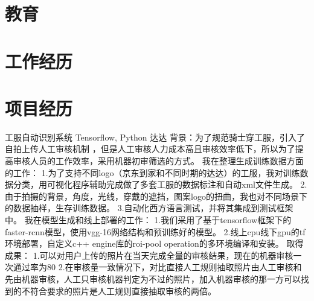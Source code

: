 \documentclass[11pt,a4paper]{moderncv}
\begin{document}
\maketitle

\section{教育}

\section{工作经历}

\section{项目经历}
{工服自动识别系统}
{Tensorflow, Python}{}
{达达}
{
背景：为了规范骑士穿工服，引入了自拍上传人工审核机制 ，但是人工审核人力成本高且审核效率低下，所以为了提高审核人员的工作效率，采用机器初审筛选的方式。
\newline
\newline  我在整理生成训练数据方面的工作：
\newline 1.为了支持不同logo（京东到家和不同时期的达达）的工服，我对训练数据分类，用可视化程序辅助完成做了多套工服的数据标注和自动xml文件生成。
\newline 2.由于拍摄的背景，角度，光线，穿戴的遮挡，图案logo的扭曲，我也对不同场景下的数据抽样，生存训练数据。
\newline 3.自动化西方语言测试，并将其集成到测试框架中。
\newline
\newline 我在模型生成和线上部署的工作：
\newline 1.我们采用了基于tensorflow框架下的faster-rcnn模型，使用vgg-16网络结构和预训练好的模型。
\newline 2.线上cpu线下gpu的tf环境部署，自定义c++ engine库的roi-pool operation的多环境编译和安装。
\newline
\newline 取得成果：
\newline 1.可以对用户上传的照片在当天完成全量的审核结果，现在的机器审核一次通过率为80%
\newline 2.在审核量一致情况下，对比直接人工规则抽取照片由人工审核和先由机器审核，人工只审核机器判定为不过的照片，加入机器审核的那一方可以找到的不符合要求的照片是人工规则直接抽取审核的两倍。
\newline
}
\end{document}
